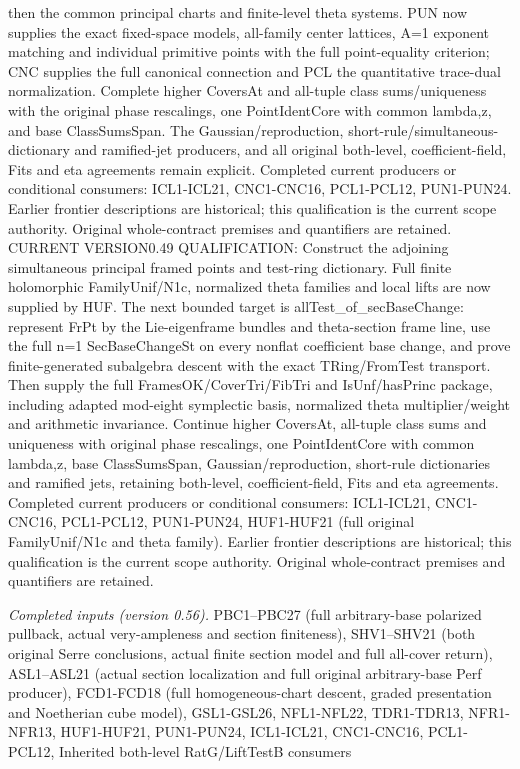 then the common principal charts and finite-level theta systems. PUN now supplies the exact fixed-space models, all-family center lattices, A=1 exponent matching and individual primitive points with the full point-equality criterion; CNC supplies the full canonical connection and PCL the quantitative trace-dual normalization. Complete higher CoversAt and all-tuple class sums/uniqueness with the original phase rescalings, one PointIdentCore with common lambda,z, and base ClassSumsSpan. The Gaussian/reproduction, short-rule/simultaneous-dictionary and ramified-jet producers, and all original both-level, coefficient-field, Fits and eta agreements remain explicit. Completed current producers or conditional consumers: ICL1-ICL21, CNC1-CNC16, PCL1-PCL12, PUN1-PUN24. Earlier frontier descriptions are historical; this qualification is the current scope authority. Original whole-contract premises and quantifiers are retained. CURRENT VERSION0.49 QUALIFICATION: Construct the adjoining simultaneous principal framed points and test-ring dictionary. Full finite holomorphic FamilyUnif/N1c, normalized theta families and local lifts are now supplied by HUF. The next bounded target is allTest\_\allowbreak of\_\allowbreak secBaseChange: represent FrPt by the Lie-eigenframe bundles and theta-section frame line, use the full n=1 SecBaseChangeSt on every nonflat coefficient base change, and prove finite-generated subalgebra descent with the exact TRing/FromTest transport. Then supply the full FramesOK/CoverTri/FibTri and IsUnf/hasPrinc package, including adapted mod-eight symplectic basis, normalized theta multiplier/weight and arithmetic invariance. Continue higher CoversAt, all-tuple class sums and uniqueness with original phase rescalings, one PointIdentCore with common lambda,z, base ClassSumsSpan, Gaussian/reproduction, short-rule dictionaries and ramified jets, retaining both-level, coefficient-field, Fits and eta agreements. Completed current producers or conditional consumers: ICL1-ICL21, CNC1-CNC16, PCL1-PCL12, PUN1-PUN24, HUF1-HUF21 (full original FamilyUnif/N1c and theta family). Earlier frontier descriptions are historical; this qualification is the current scope authority. Original whole-contract premises and quantifiers are retained.

\emph{Completed inputs (version 0.56).} PBC1–PBC27 (full arbitrary-base polarized pullback, actual very-ampleness and section finiteness), SHV1–SHV21 (both original Serre conclusions, actual finite section model and full all-cover return), ASL1–ASL21 (actual section localization and full original arbitrary-base Perf producer), FCD1-FCD18 (full homogeneous-chart descent, graded presentation and Noetherian cube model), GSL1-GSL26, NFL1-NFL22, TDR1-TDR13, NFR1-NFR13, HUF1-HUF21, PUN1-PUN24, ICL1-ICL21, CNC1-CNC16, PCL1-PCL12, Inherited both-level RatG/LiftTestB consumers

